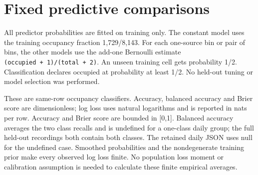\par{}

\section{Fixed predictive comparisons}\label{fixed-predictive-comparisons}

All predictor probabilities are fitted on training only. The constant model uses the training occupancy fraction 1,729/8,143. For each one-source bin or pair of bins, the other models use the add-one Bernoulli estimate \texttt{(occupied\ +\ 1)/(total\ +\ 2)}. An unseen training cell gets probability 1/2. Classification declares occupied at probability at least 1/2. No held-out tuning or model selection was performed.

These are same-row occupancy classifiers. Accuracy, balanced accuracy and Brier score are dimensionless; log loss uses natural logarithms and is reported in nats per row. Accuracy and Brier score are bounded in {[}0,1{]}. Balanced accuracy averages the two class recalls and is undefined for a one-class daily group; the full held-out recordings both contain both classes. The retained daily JSON uses null for the undefined case. Smoothed probabilities and the nondegenerate training prior make every observed log loss finite. No population loss moment or calibration assumption is needed to calculate these finite empirical averages.

